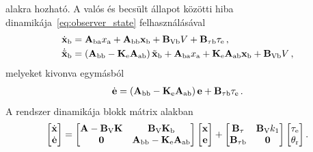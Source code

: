 alakra hozható. A valós és becsült állapot közötti hiba dinamikája~\eqref{eq:observer_state} felhasználásával
\begin{equation}
    \begin{split}
    \dot{\mathbf{x}}_{\mathrm{b}} &= \mathbf{A}_{\mathrm{ba}} x_{\mathrm{a}} + \mathbf{A}_{\mathrm{bb}} \mathbf{x}_{\mathrm{b}} + 
    \mathbf{B}_{\mathrm{Vb}} V + \mathbf{B}_{\mathrm{\tau b}} \tau_{\mathrm{e}}\,,\\
    \dot{\tilde{\mathbf{x}}}_{\mathrm{b}} &= \left(\mathbf{A}_{\mathrm{bb}} - \mathbf{K}_{\mathrm{e}} \mathbf{A}_{\mathrm{ab}}\right) \tilde{\mathbf{x}}_{\mathrm{b}} +
    \mathbf{A}_{\mathrm{ba}} x_{\mathrm{a}} +
    \mathbf{K}_{\mathrm{e}} \mathbf{A}_{\mathrm{ab}} \mathbf{x}_{\mathrm{b}} +
    \mathbf{B}_{\mathrm{Vb}} V\,,
    \end{split}
\end{equation}
melyeket kivonva egymásból
\begin{align}
    \dot{\mathbf{e}} = \left(\mathbf{A}_{\mathrm{bb}} - \mathbf{K}_{\mathrm{e}} \mathbf{A}_{\mathrm{ab}}\right) \mathbf{e} + \mathbf{B}_{\mathrm{\tau b}} \tau_{\mathrm{e}}\,.
\end{align}
A rendszer dinamikája blokk mátrix alakban
\begin{align}
    \begin{bmatrix}
        \dot{\mathbf{x}} \\
        \dot{\mathbf{e}}
    \end{bmatrix}
    =
    \begin{bmatrix}
        \mathbf{A} - \mathbf{B}_{\mathrm{V}} \mathbf{K} & \mathbf{B}_{\mathrm{V}} \mathbf{K}_{\mathrm{b}} \\
        \mathbf{0} & \mathbf{A}_{\mathrm{bb}} - \mathbf{K}_{\mathrm{e}} \mathbf{A}_{\mathrm{ab}}
    \end{bmatrix}
    \begin{bmatrix}
        \mathbf{x} \\
        \mathbf{e}
    \end{bmatrix}
    +
    \begin{bmatrix}
        \mathbf{B}_{\mathrm{\tau}} & \mathbf{B}_{\mathrm{V}} k_1\\
        \mathbf{B}_{\mathrm{\tau b}} & \mathbf{0}
    \end{bmatrix}
    \begin{bmatrix}
        \tau_{\mathrm{e}} \\
        \theta_{\mathrm{r}}
    \end{bmatrix}.
\end{align}

